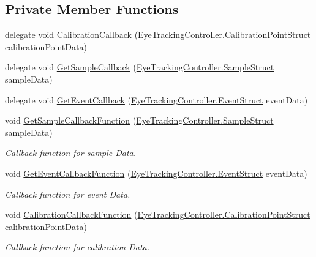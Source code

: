 \subsection*{Private Member Functions}
\begin{DoxyCompactItemize}
\item 
delegate void \hyperlink{class_web_analyzer_1_1_eye_tracking_1_1_eye_tracking_model_ad6c2f20511c53eaf55a8fb18d263b51c}{Calibration\+Callback} (\hyperlink{struct_web_analyzer_1_1_eye_tracking_1_1_eye_tracking_controller_1_1_calibration_point_struct}{Eye\+Tracking\+Controller.\+Calibration\+Point\+Struct} calibration\+Point\+Data)
\item 
delegate void \hyperlink{class_web_analyzer_1_1_eye_tracking_1_1_eye_tracking_model_afa0ffe40b73c90761f49dec896df4baa}{Get\+Sample\+Callback} (\hyperlink{struct_web_analyzer_1_1_eye_tracking_1_1_eye_tracking_controller_1_1_sample_struct}{Eye\+Tracking\+Controller.\+Sample\+Struct} sample\+Data)
\item 
delegate void \hyperlink{class_web_analyzer_1_1_eye_tracking_1_1_eye_tracking_model_a40785479d78104c591e53c7e2847e9ff}{Get\+Event\+Callback} (\hyperlink{struct_web_analyzer_1_1_eye_tracking_1_1_eye_tracking_controller_1_1_event_struct}{Eye\+Tracking\+Controller.\+Event\+Struct} event\+Data)
\item 
void \hyperlink{class_web_analyzer_1_1_eye_tracking_1_1_eye_tracking_model_a88d3a53476fe1dc652fbbb7ce8b30fdd}{Get\+Sample\+Callback\+Function} (\hyperlink{struct_web_analyzer_1_1_eye_tracking_1_1_eye_tracking_controller_1_1_sample_struct}{Eye\+Tracking\+Controller.\+Sample\+Struct} sample\+Data)
\begin{DoxyCompactList}\small\item\em Callback function for sample Data. \end{DoxyCompactList}\item 
void \hyperlink{class_web_analyzer_1_1_eye_tracking_1_1_eye_tracking_model_a01a7efee3ea0a2a06c1c7405d8fb9598}{Get\+Event\+Callback\+Function} (\hyperlink{struct_web_analyzer_1_1_eye_tracking_1_1_eye_tracking_controller_1_1_event_struct}{Eye\+Tracking\+Controller.\+Event\+Struct} event\+Data)
\begin{DoxyCompactList}\small\item\em Callback function for event Data. \end{DoxyCompactList}\item 
void \hyperlink{class_web_analyzer_1_1_eye_tracking_1_1_eye_tracking_model_a64c9fd68eba26c6731242d9bf3c07a53}{Calibration\+Callback\+Function} (\hyperlink{struct_web_analyzer_1_1_eye_tracking_1_1_eye_tracking_controller_1_1_calibration_point_struct}{Eye\+Tracking\+Controller.\+Calibration\+Point\+Struct} calibration\+Point\+Data)
\begin{DoxyCompactList}\small\item\em Callback function for calibration Data. \end{DoxyCompactList}\end{DoxyCompactItemize}

